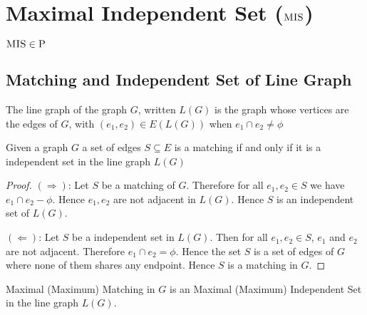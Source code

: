 \section{Maximal Independent Set ($\textsc{MIS}$)}
\begin{theorem}
	$\textsc{MIS}\in \textsc{P}$
\end{theorem}

\subsection{Matching and Independent Set of Line Graph}

\begin{definition}
	The line graph of the graph $G$, written $L(G)$  is the graph whose vertices are the edges of $G$, with $(e_1,e_2)\in E(L(G))$ when $e_1\cap e_2\neq \phi$
\end{definition}

\begin{theorem}
	Given a graph $G$ a set of edges $S\subseteq E$ is a matching if and only if it is a independent set in the line graph $L(G)$
\end{theorem}
\begin{proof}
	$(\Rightarrow)$: Let $S$ be a matching of $G$. Therefore for all $e_1,e_2\in S$ we have $e_1\cap e_2-\phi$. Hence $e_1,e_2$ are not adjacent in $L(G)$. Hence $S$ is an independent set of $L(G)$.
	
	$(\Leftarrow)$: Let $S$ be a independent set in $L(G)$. Then for all $e_1,e_2\in S$, $e_1$ and $e_2$ are not adjacent. Therefore $e_1\cap e_2=\phi$. Hence the set $S$ is a set of edges of $G$ where none of them shares any endpoint. Hence $S$ is a matching in $G$.
\end{proof}

\begin{fact}
	Maximal (Maximum) Matching in $G$ is an Maximal (Maximum) Independent Set  in the line graph $L(G)$.
\end{fact}

